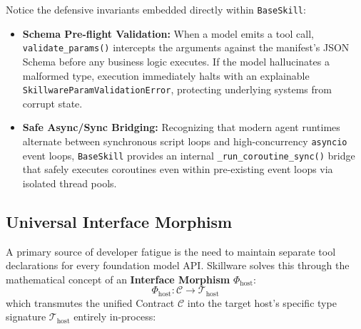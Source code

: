 Notice the defensive invariants embedded directly within \texttt{BaseSkill}:
\begin{itemize}[leftmargin=*]
  \item \textbf{Schema Pre-flight Validation:} When a model emits a tool call, \texttt{validate\_params()} intercepts the arguments against the manifest's JSON Schema before any business logic executes. If the model hallucinates a malformed type, execution immediately halts with an explainable \texttt{Skillware\allowbreak Param\allowbreak Validation\allowbreak Error}, protecting underlying systems from corrupt state.
  \item \textbf{Safe Async/Sync Bridging:} Recognizing that modern agent runtimes alternate between synchronous script loops and high-concurrency \texttt{asyncio} event loops, \texttt{BaseSkill} provides an internal \texttt{\_run\_coroutine\_sync()} bridge that safely executes coroutines even within pre-existing event loops via isolated thread pools.
\end{itemize}

\subsection{Universal Interface Morphism}
\label{subsec:interface_morphism}

A primary source of developer fatigue is the need to maintain separate tool declarations for every foundation model API. Skillware solves this through the mathematical concept of an \textbf{Interface Morphism} $\Phi_{\text{host}}$:
\begin{equation}
\label{eq:morphism}
\Phi_{\text{host}}: \mathcal{C} \longrightarrow \mathcal{T}_{\text{host}}
\end{equation}
which transmutes the unified Contract $\mathcal{C}$ into the target host's specific type signature $\mathcal{T}_{\text{host}}$ entirely in-process:

